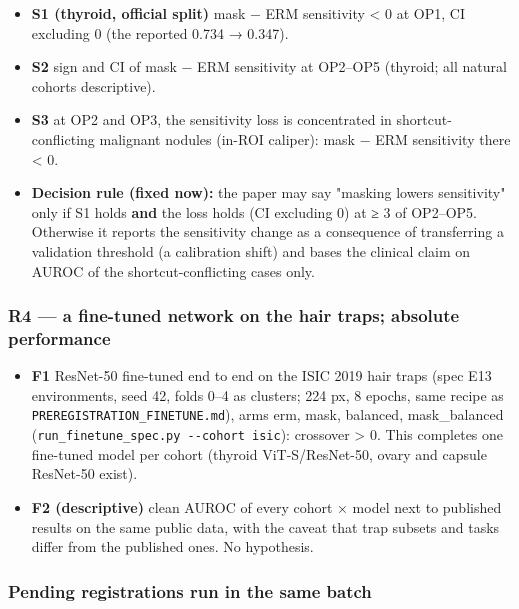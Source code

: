 {\begin{itemize}
\item
  \textbf{S1 (thyroid, official split)} mask − ERM sensitivity \textless{} 0 at OP1, CI excluding 0 (the reported 0.734 → 0.347).
\item
  \textbf{S2} sign and CI of mask − ERM sensitivity at OP2--OP5 (thyroid; all natural cohorts descriptive).
\item
  \textbf{S3} at OP2 and OP3, the sensitivity loss is concentrated in shortcut-conflicting malignant nodules (in-ROI
  caliper): mask − ERM sensitivity there \textless{} 0.
\item
  \textbf{Decision rule (fixed now):} the paper may say "masking lowers sensitivity" only if S1 holds \textbf{and} the loss
  holds (CI excluding 0) at ≥ 3 of OP2--OP5. Otherwise it reports the sensitivity change as a consequence of
  transferring a validation threshold (a calibration shift) and bases the clinical claim on AUROC of the
  shortcut-conflicting cases only.
\end{itemize}

\subsubsection{R4 --- a fine-tuned network on the hair traps; absolute performance}\label{r4--a-fine-tuned-network-on-the-hair-traps-absolute-performance}

\begin{itemize}

\item
  \textbf{F1} ResNet-50 fine-tuned end to end on the ISIC 2019 hair traps (spec E13 environments, seed 42, folds 0--4 as
  clusters; 224 px, 8 epochs, same recipe as \texttt{PREREGISTRATION\_FINETUNE.md}), arms erm, mask, balanced,
  mask\_balanced (\texttt{run\_finetune\_spec.py\ -\/-cohort\ isic}): crossover \textgreater{} 0. This completes one fine-tuned model per
  cohort (thyroid ViT-S/ResNet-50, ovary and capsule ResNet-50 exist).
\item
  \textbf{F2 (descriptive)} clean AUROC of every cohort × model next to published results on the same public data, with
  the caveat that trap subsets and tasks differ from the published ones. No hypothesis.
\end{itemize}

\subsubsection{Pending registrations run in the same batch}\label{pending-registrations-run-in-the-same-batch}

}
